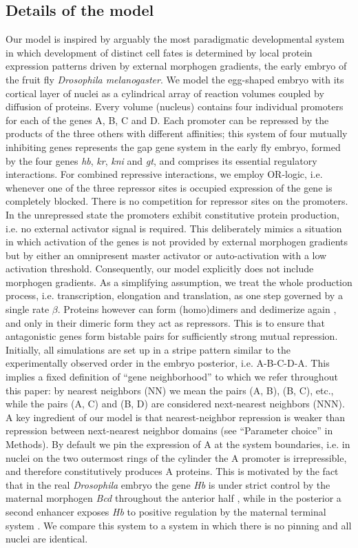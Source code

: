 \documentclass[a4paper,10pt]{article}
\newcommand{\Drosophila}{{\it Drosophila}\xspace}
\newcommand{\hb}{{\it hb}\xspace}
\newcommand{\kr}{{\it kr}\xspace}
\newcommand{\kni}{{\it kni}\xspace}
\newcommand{\gt}{{\it gt}\xspace}
\newcommand{\Hb}{{\it Hb}\xspace}
\newcommand{\Bcd}{{\it Bcd}\xspace}
\newcommand{\GA}{A\xspace}
\newcommand{\GB}{B\xspace}
\newcommand{\GC}{C\xspace}
\newcommand{\GD}{D\xspace}
\begin{document}
\subsection*{Details of the model}
Our model is inspired by arguably the most paradigmatic developmental system
in which development of distinct cell fates is determined by local protein expression
patterns driven by external morphogen gradients, the early embryo of the fruit fly {\it Drosophila melanogaster}.
We model the egg-shaped embryo with its cortical layer of nuclei as
a cylindrical array of reaction volumes coupled by diffusion of proteins.
Every volume (nucleus) contains four individual promoters for each of the genes
\GA, \GB, \GC and \GD.
Each promoter can be repressed by the products of the three others with
different affinities; this system of four mutually inhibiting genes represents the gap gene system in the early fly embryo, formed by the four genes \hb, \kr, \kni and \gt, and comprises its essential regulatory interactions.
For combined repressive interactions, we employ OR-logic, i.e. whenever one of the three repressor sites is
occupied expression of the gene is completely blocked.
There is no competition for repressor sites on the promoters.
In the unrepressed state the promoters exhibit constitutive
protein production, i.e. no external activator signal is required.
This deliberately mimics a situation in which activation of the genes
is not provided by external morphogen gradients but by either an omnipresent
master activator or auto-activation with a low activation threshold.
Consequently, our model explicitly does not include morphogen gradients.
As a simplifying assumption, we treat the whole production process, 
i.e. transcription, elongation and translation, as one step governed by a single rate $\beta$.
Proteins however can form (homo)dimers and dedimerize again \cite{McCarty2003,Sauer1993},
and only in their dimeric form they act as repressors.
This is to ensure that antagonistic genes form bistable pairs for sufficiently strong
mutual repression.
Initially, all simulations are set up in a stripe pattern similar to the
experimentally observed order in the embryo posterior, i.e.
\GA-\GB-\GC-\GD-\GA \cite{Surkova2008, Jaeger2004, Clyde2003}.
This implies a fixed definition of ``gene neighborhood'' to which we refer throughout
this paper: 
by nearest neighbors (NN) we mean the pairs (\GA, \GB), (\GB, \GC), etc.,
while the pairs (\GA, \GC) and (\GB, \GD) are considered next-nearest neighbors (NNN).
A key ingredient of our model is that nearest-neighbor repression is
weaker than repression between next-nearest neighbor domains 
(see ``Parameter choice'' in Methods).
By default we pin the expression of \GA at the system boundaries,
i.e. in nuclei on the two outermost rings of the cylinder the \GA promoter
is irrepressible, and therefore constitutively produces \GA proteins.
This is motivated by the fact that in the real \Drosophila embryo the gene \Hb is under strict control by
the maternal morphogen \Bcd throughout the anterior half \cite{Driever1989}, 
while in the posterior a second enhancer exposes \Hb 
to positive regulation by the maternal terminal system \cite{Margolis1995, Casanova1990, Weigel1990}.
We compare this system to a system in which there is no pinning and all nuclei are identical.
\end{document}
